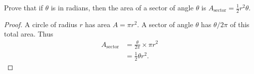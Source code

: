 \question[2]
Prove that if $\theta$ is in radians, then the area of a sector of angle $\theta$ is $A_{\textrm{sector}} = \frac{1}{2} r^2\theta$.

\begin{EnvFullwidth}
\begin{solutionorgrid}[2in]
\begin{proof}
A circle of radius $r$ has area $A = \pi r^2$. A sector of angle $\theta$ has $\theta/2\pi$ of this total area. Thus
\begin{align*}
	A_{\textrm{sector}} &= \frac{\theta}{2\pi} \times \pi r^2 \\
	&= \frac{1}{2} \theta r^2.
\end{align*}
\end{proof}
\end{solutionorgrid}
\end{EnvFullwidth}
